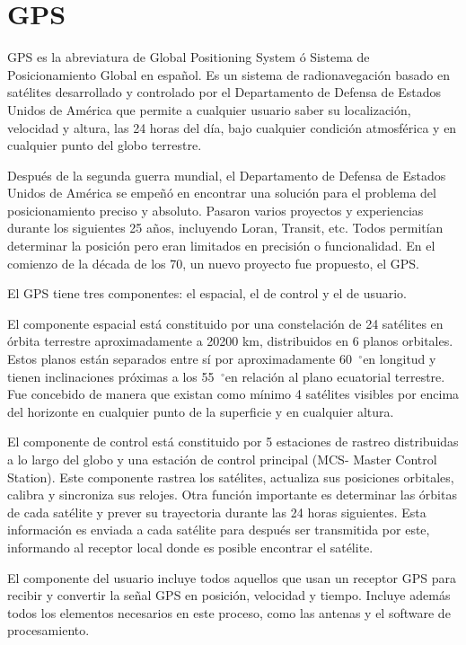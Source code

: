 \section{GPS}

\newcommand{\grad}{\hspace{-2mm}$\phantom{a}^{\circ}$}

GPS es la abreviatura de Global Positioning System ó Sistema de Posicionamiento Global en español. Es un sistema de radionavegación basado en satélites desarrollado y controlado por el Departamento de Defensa de Estados Unidos de América que permite a cualquier usuario saber su localización, velocidad y altura, las 24 horas del día, bajo cualquier condición atmosférica y en cualquier punto del globo terrestre. 

Después de la segunda guerra mundial, el Departamento de Defensa de Estados Unidos de América se empeñó en encontrar una solución para el problema del posicionamiento preciso y absoluto. Pasaron varios proyectos y experiencias durante los siguientes 25 años, incluyendo Loran, Transit, etc. Todos permitían determinar la posición pero eran limitados en precisión o funcionalidad. En el comienzo de la década de los 70, un nuevo proyecto fue propuesto, el GPS. 

El GPS tiene tres componentes: el espacial, el de control y el de usuario.

El componente espacial está constituido por una constelación de 24 satélites en órbita terrestre aproximadamente a 20200 km, distribuidos en 6 planos orbitales. Estos planos están separados entre sí por aproximadamente 60\grad   en longitud y tienen inclinaciones próximas a los 55\grad   en relación al plano ecuatorial terrestre. Fue concebido de manera que existan como mínimo 4 satélites visibles por encima del horizonte en cualquier punto de la superficie y en cualquier altura.

El componente de control está constituido por 5 estaciones de rastreo distribuidas a lo largo del globo y una estación de control principal (MCS- Master Control Station). Este componente rastrea los satélites, actualiza sus posiciones orbitales, calibra y sincroniza sus relojes. Otra función importante es determinar las órbitas de cada satélite y prever su trayectoria durante las 24 horas siguientes. Esta información es enviada a cada satélite para después ser transmitida por este, informando al receptor local donde es posible encontrar el satélite. 

El componente del usuario incluye todos aquellos que usan un receptor GPS para recibir y convertir la señal GPS en posición, velocidad y tiempo. Incluye además todos los elementos necesarios en este proceso, como las antenas y el software de procesamiento. 


